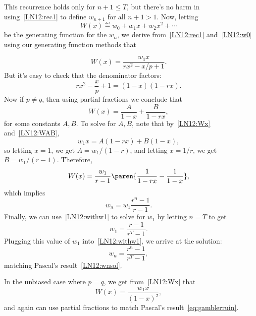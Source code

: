 This recurrence holds only for $n+1 \leq T$, but there's no harm in
using~\eqref{LN12:rec1} to define $w_{n+1}$ for all $n+1 >1$.  Now, letting
\[
W(x) \eqdef w_0 + w_1x + w_2x^2 + \cdots
\]
be the generating function for the $w_n$, we derive from~\eqref{LN12:rec1}
and~\eqref{LN12:w0} using our generating function methods that
\iffalse
\[
W(x) -\frac{xW(x)}{p} + rx^2W(x) = w_1x,
\]
so
\fi
\begin{equation}\label{LN12:Wx}
W(x) = \frac{w_1x}{rx^2- x/p + 1}.
\end{equation}
But it's easy to check that the denominator factors:
\[
rx^2 - \frac{x}{p} + 1 = (1-x)(1-rx).
\]
Now if $p \neq q$, then using partial fractions we conclude that
\begin{equation}\label{LN12:WAB}
W(x) = \frac{A}{1-x} + \frac{B}{1-rx},
\end{equation}
for some constants $A,B$.  To solve for $A,B$, note that
by~\eqref{LN12:Wx} and~\eqref{LN12:WAB},
\[
w_1 x = A(1-rx) + B(1-x),
\]
so letting $x=1$, we get $A=w_1/(1-r)$, and letting $x=1/r$, we get
$B=w_1/(r-1)$.  Therefore,
\[
W(x) = \frac{w_1}{r-1} \paren{\frac{1}{1-rx} - \frac{1}{1-x}},
\]
which implies
\begin{equation}\label{LN12:withw1}
w_n = w_1\frac{r^n - 1}{r-1}.
\end{equation}
Finally, we can use~\eqref{LN12:withw1} to solve for $w_1$ by letting
$n=T$ to get \iffalse
\[
1=w_T = \frac{w_1}{r-1}\paren{r^T - 1}
\]
so
\fi
\[
w_1= \frac{r - 1}{r^T-1}.
\]
Plugging this value of $w_1$ into~\eqref{LN12:withw1}, we arrive at
the solution:
\[
w_n = \frac{r^n-1}{r^T -1},
\]
matching Pascal's result~\eqref{LN12:wnsol}.

In the unbiased case where $p=q$, we get from~\eqref{LN12:Wx} that
\[
W(x) = \frac{w_1 x}{(1-x)^2},
\]
and again can use partial fractions to match Pascal's
result~\eqref{eq:gamblerruin}.

\iffalse
Our derivation of~(\ref{LN12:wnsol}) ensures that it gives a formula for $w_n$
which satisfies~(\ref{LN12:rec1}) and has the right values at $n=0$ and $n=T$.
Moreover, the values determined by~(\ref{LN12:wnsol}) are the \emph{only ones}
that satisfy~\eqref{LN12:rec1} and the boundary conditions at $0$ and $T$,
though we won't prove this.  This implies that the Gambler's probability
of winning is indeed given by~\eqref{LN12:wnsol}.
\fi


